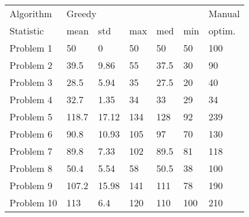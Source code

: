 \begin{tabular}{lllllll}
\toprule
Algorithm & \multicolumn{5}{l}{Greedy} & Manual \\
Statistic &   mean &    std &  max &   med &  min & optim. \\
\midrule
Problem 1  &     50 &      0 &   50 &    50 &   50 &    100 \\
Problem 2  &   39.5 &   9.86 &   55 &  37.5 &   30 &     90 \\
Problem 3  &   28.5 &   5.94 &   35 &  27.5 &   20 &     40 \\
Problem 4  &   32.7 &   1.35 &   34 &    33 &   29 &     34 \\
Problem 5  &  118.7 &  17.12 &  134 &   128 &   92 &    239 \\
Problem 6  &   90.8 &  10.93 &  105 &    97 &   70 &    130 \\
Problem 7  &   89.8 &   7.33 &  102 &  89.5 &   81 &    118 \\
Problem 8  &   50.4 &   5.54 &   58 &  50.5 &   38 &    100 \\
Problem 9  &  107.2 &  15.98 &  141 &   111 &   78 &    190 \\
Problem 10 &    113 &    6.4 &  120 &   110 &  100 &    210 \\
\bottomrule
\end{tabular}
